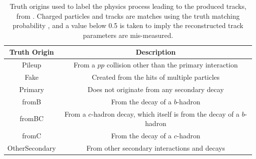 \begin{table}[h]
  \begin{center}
      \begin{tabular}{cc} 
      	 \hline \hline
          Truth Origin & Description \\ \hline
          Pileup           & From a $pp$ collision other than the primary interaction   \\
          Fake             & Created from the hits of multiple particles  \\
          Primary          & Does not originate from any secondary decay  \\
          fromB            & From the decay of a $b$-hadron  \\
          fromBC           & From a $c$-hadron decay, which itself is from the decay of a $b$-hadron   \\
          fromC            & From the decay of a $c$-hadron \\
          OtherSecondary   & From other secondary interactions and decays  \\ \hline \hline
      \end{tabular}
    \caption{Truth origins used to label the physics process leading to the produced tracks, from \cite{ATL-PHYS-PUB-2022-027}. Charged particles and tracks are matches using the truth matching probability \cite{ATLAS-tracks-algo}, and a value below 0.5 is taken to imply the reconstructed track parameters are mis-measured.}
    \label{tab:gnTrackOrigin}
  \end{center}
\end{table}

